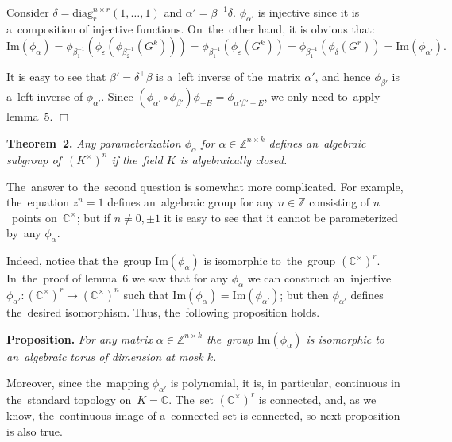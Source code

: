 \documentclass[twoside]{article}
\begin{document}
    Consider $\delta = \mathrm{diag}^{n \times r}_r(1, \ldots, 1)$ and $\alpha' = \beta^{-1} \delta$.
    $\phi_{\alpha'}$ is injective since it is a~composition of injective functions. On~the~other hand, it is obvious that:
    $$
        \mathrm{Im}(\phi_\alpha) = \phi_{\beta_1^{-1}} (\phi_\varepsilon (\phi_{\beta_2^{-1}} (G^k)))
                                 = \phi_{\beta_1^{-1}} (\phi_\varepsilon (G^k))
                                 = \phi_{\beta_1^{-1}} (\phi_{\delta} (G^r))
                                 = \mathrm{Im}(\phi_{\alpha'}).
    $$

    It is easy to see that $\beta' = \delta^{\top} \beta$ is a~left inverse of the~matrix $\alpha'$,
    and hence $\phi_{\beta'}$ is a~left inverse of $\phi_{\alpha'}$. Since $(\phi_{\alpha'} \circ \phi_{\beta'}) \phi_{-E} = \phi_{\alpha' \beta' - E}$,
    we only need to~apply lemma~5.
\hfill$\Box$\medskip

\medskip\noindent\textbf{Theorem~2.}\emph{
    Any parameterization $\phi_\alpha$ for $\alpha \in \mathbb{Z}^{n \times k}$ defines an~algebraic subgroup
    of~$(K^\times)^n$ if the~field $K$ is algebraically closed.
}\medskip

The~answer to~the~second question is somewhat more complicated. For example, the~equation $z^n = 1$ defines an~algebraic
group for any $n \in \mathbb{Z}$ consisting of $n$~points on~$\mathbb{C}^\times$; but if $n \neq 0, \pm 1$
it is easy to see that it cannot be parameterized by~any $\phi_\alpha$.

Indeed, notice that the~group $\mathrm{Im}(\phi_\alpha)$ is isomorphic to~the~group $(\mathbb{C}^\times)^r$.
In~the~proof of lemma~6 we saw that for any $\phi_\alpha$ we can construct an~injective $\phi_{\alpha'} : (\mathbb{C}^\times)^r \rightarrow (\mathbb{C}^\times)^n$
such that $\mathrm{Im}(\phi_\alpha) = \mathrm{Im}(\phi_{\alpha'})$; but then $\phi_{\alpha'}$ defines the~desired isomorphism.
Thus, the~following proposition holds.

\medskip\noindent\textbf{Proposition.}\emph{
    For any matrix $\alpha \in \mathbb{Z}^{n \times k}$ the~group $\mathrm{Im}(\phi_\alpha)$ is isomorphic to an~algebraic torus
    of dimension at mosk $k$.
}\medskip

Moreover, since the~mapping $\phi_{\alpha'}$ is polynomial, it is, in particular, continuous in the~standard topology
on~$K = \mathbb{C}$. The~set $(\mathbb{C}^\times)^r$ is connected, and, as we know, the~continuous image
of a~connected set is connected, so next proposition is also true.
\end{document}
